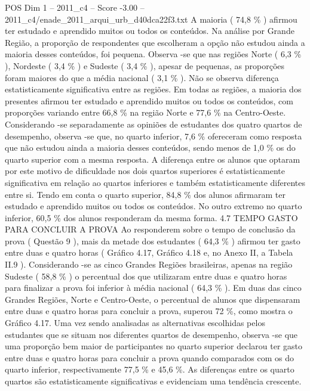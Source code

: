 \begin{textsample}{POS Dim 1 – 2011\_c4 – Score -3.00 – 2011\_c4/enade\_2011\_arqui\_urb\_d40dca22f3.txt}
A maioria ( 74,8 \% ) afirmou ter estudado e aprendido muitos ou todos os conteúdos.
Na análise por Grande Região, a proporção de respondentes que escolheram a opção não estudou ainda a maioria desses conteúdos, foi pequena.
Observa -se que nas regiões Norte ( 6,3 \% ), Nordeste ( 3,4 \% ) e Sudeste ( 3,4 \% ), apesar de pequenas, as proporções foram maiores do que a média nacional ( 3,1 \% ).
Não se observa diferença estatisticamente significativa entre as regiões.
Em todas as regiões, a maioria dos presentes afirmou ter estudado e aprendido muitos ou todos os conteúdos, com proporções variando entre 66,8 \% na região Norte e 77,6 \% na Centro-Oeste.
Considerando -se separadamente as opiniões de estudantes dos quatro quartos de desempenho, observa -se que, no quarto inferior, 7,6 \% ofereceram como resposta que não estudou ainda a maioria desses conteúdos, sendo menos de 1,0 \% os do quarto superior com a mesma resposta.
A diferença entre os alunos que optaram por este motivo de dificuldade nos dois quartos superiores é estatisticamente significativa em relação ao quartos inferiores e também estatisticamente diferentes entre si.
Tendo em conta o quarto superior, 84,8 \% dos alunos afirmaram ter estudado e aprendido muitos ou todos os conteúdos.
No outro extremo no quarto inferior, 60,5 \% dos alunos responderam da mesma forma. 4.7 TEMPO GASTO PARA CONCLUIR A PROVA Ao responderem sobre o tempo de conclusão da prova ( Questão 9 ), mais da metade dos estudantes ( 64,3 \% ) afirmou ter gasto entre duas e quatro horas ( Gráfico 4.17, Gráfico 4.18 e, no Anexo II, a Tabela II.9 ).
Considerando -se as cinco Grandes Regiões brasileiras, apenas na região Sudeste ( 58,8 \% ) o percentual dos que utilizaram entre duas e quatro horas para finalizar a prova foi inferior à média nacional ( 64,3 \% ).
Em duas das cinco Grandes Regiões, Norte e Centro-Oeste, o percentual de alunos que dispensaram entre duas e quatro horas para concluir a prova, superou 72 \%, como mostra o Gráfico 4.17.
Uma vez sendo analisadas as alternativas escolhidas pelos estudantes que se situam nos diferentes quartos de desempenho, observa -se que uma proporção bem maior de participantes no quarto superior declarou ter gasto entre duas e quatro horas para concluir a prova quando comparados com os do quarto inferior, respectivamente 77,5 \% e 45,6 \%.
As diferenças entre os quarto quartos são estatisticamente significativas e evidenciam uma tendência crescente.

\end{textsample}
